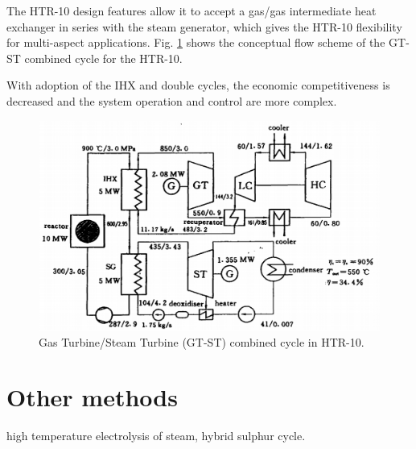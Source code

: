 The HTR-10 design features allow it to accept a gas/gas intermediate heat exchanger in series with the steam generator, which gives the HTR-10 flexibility for multi-aspect applications. Fig. \ref{fig:gtst} shows the conceptual flow scheme of the GT-ST combined cycle for the HTR-10.

With adoption of the IHX and double cycles, the economic competitiveness is decreased and the system operation and control are more complex.

\cite{yuanhui_htgr_1996}

\begin{figure}[H]
	\centering
	\includegraphics[width=0.4\linewidth]{figures/htgr-gtst.png}
	\hfill
	\caption{Gas Turbine/Steam Turbine (GT-ST) combined cycle in HTR-10.}
	\label{fig:gtst}
\end{figure}

\section{Other methods}

high temperature electrolysis of steam, hybrid sulphur cycle.
\cite{jung_study_2007}